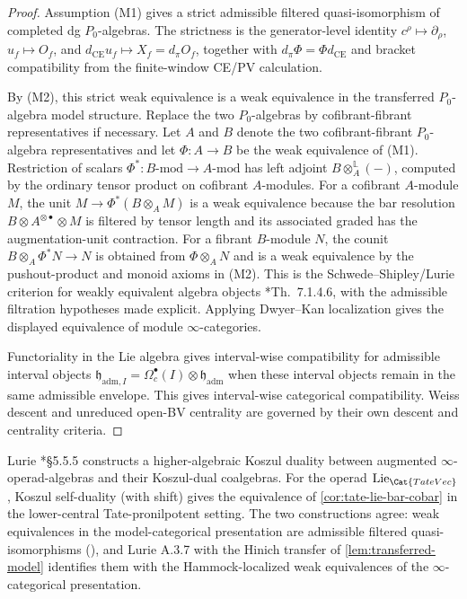 \begin{proof}
  Assumption (M1) gives a strict admissible filtered quasi-isomorphism of
  completed dg \(P_0\)-algebras.  The strictness is the generator-level
  identity \(c^\rho\mapsto\partial_\rho\), \(u_f\mapsto O_f\), and
  \(d_{\mathrm{CE}}u_f\mapsto X_f=d_\pi O_f\), together with
  \(d_\pi\Phi=\Phi d_{\mathrm{CE}}\) and bracket compatibility from the
  finite-window CE/PV calculation.

  By (M2), this strict weak equivalence is a weak equivalence in the
  transferred \(P_0\)-algebra model structure.  Replace the two
  \(P_0\)-algebras by cofibrant-fibrant representatives if necessary.
  Let \(A\) and \(B\) denote the two cofibrant-fibrant
  \(P_0\)-algebra representatives and let
  \(\Phi:A\to B\) be the weak equivalence of (M1).  Restriction of
  scalars \(\Phi^\ast:B\text{-mod}\to A\text{-mod}\) has left adjoint
  \(B\otimes_A^{\mathbb L}(-)\), computed by the ordinary tensor
  product on cofibrant \(A\)-modules.  For a cofibrant \(A\)-module
  \(M\), the unit
  \(M\to\Phi^\ast(B\otimes_A M)\) is a weak equivalence because the
  bar resolution
  \(B\otimes A^{\otimes \bullet}\otimes M\) is filtered by tensor length
  and its associated graded has the augmentation-unit contraction.  For
  a fibrant \(B\)-module \(N\), the counit
  \(B\otimes_A\Phi^\ast N\to N\) is obtained from \(\Phi\otimes_A N\)
  and is a weak equivalence by the pushout-product and monoid axioms in
  (M2).  This is the Schwede--Shipley/Lurie criterion for weakly
  equivalent algebra objects
  \cite{schwede-shipley-monoid}\cite{lurie-ha}*{Th.~7.1.4.6}, with the
  admissible filtration hypotheses made explicit.  Applying
  Dwyer--Kan localization gives the displayed equivalence of module
  \(\infty\)-categories.

  Functoriality in the Lie algebra gives interval-wise compatibility for
  admissible interval objects
  \(\mathfrak h_{\mathrm{adm},I}=
  \Omega^\bullet_c(I)\otimes\mathfrak h_{\mathrm{adm}}\) when these
  interval objects remain in the same admissible envelope.  This gives
	  interval-wise categorical compatibility. Weiss descent and unreduced
	  open-BV centrality are governed by their own descent and centrality
	  criteria.
\end{proof}

\begin{rmk}
  \label{rmk:lurie-koszul}
  Lurie \cite{lurie-ha}*{\S 5.5.5} constructs a higher-algebraic
  Koszul duality between augmented $\infty$-operad-algebras and
  their Koszul-dual coalgebras.  For the operad
  $\mathrm{Lie}_{\Cat{TateVec}}$, Koszul self-duality (with
  shift) gives the equivalence of \ref{cor:tate-lie-bar-cobar}
  in the lower-central Tate-pronilpotent setting.  The two
  constructions agree: weak equivalences in the model-categorical
  presentation are admissible filtered quasi-isomorphisms
  (\alpharef), and Lurie A.3.7 with the Hinich transfer of
  \ref{lem:transferred-model} identifies them with the
  Hammock-localized weak equivalences of the $\infty$-categorical
  presentation.
\end{rmk}

